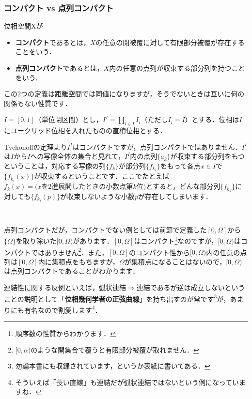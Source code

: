 \subsubsection{コンパクト vs 点列コンパクト}
\begin{defi}
位相空間Xが
\begin{itemize}
\item {\bf コンパクト}であるとは，$X$の任意の開被覆に対して有限部分被覆が存在することをいう．
\item {\bf 点列コンパクト}であるとは，$X$内の任意の点列が収束する部分列を持つことをいう．
\end{itemize}
\end{defi}
この2つの定義は距離空間では同値になりますが，そうでないときは互いに何の関係もない性質です．
\begin{ex}[$I^I$]
$I=[0,1]$（単位閉区間）とし，$I^I=\displaystyle \prod_{i\in I}I_i$（ただし$I_i=I$）とする．位相は$I$にユークリッド位相を入れたものの直積位相とする．
\end{ex}
Tychonoffの定理より$I^I$はコンパクトですが，点列コンパクトではありません．$I^I$は$I$から$I$への写像全体の集合と見れて，$I^I$内の点列$\{a_k\}$が収束する部分列をもつということは，対応する写像の列$\{f_k\}$が部分列$\{f_{k_i}\}$をもって各点$x\in I$で$\{ f_{k_i}(x) \}$が収束するということです．ここでたとえば$f_k(x)=(x\text{を2進展開したときの小数点第}k\text{位)}$とすると，どんな部分列$\{f_{k_1}\}$に対しても$\{f_{k_i}(p)\}$が収束しないような小数$p$が存在してしまいます．\par 
　\par
点列コンパクトだが，コンパクトでない例としては前節で定義した$[0,\Omega]$から$\{\Omega\}$を取り除いた$[0,\Omega)$があります．$[0,\Omega]$はコンパクト\footnote{順序数の性質からわかります．}なのですが，$[0,\Omega)$はコンパクトではありません\footnote{$[0,\alpha)$のような開集合で覆うと有限部分被覆が取れません．}．また，$[0,\Omega]$のコンパクト性から$[0,\Omega)$内の任意の点列は$[0,\Omega]$内に集積点をもちますが，$\Omega$が集積点になることはないので，$[0,\Omega)$は点列コンパクトであることがわかります．

連結性に関する反例といえば，弧状連結$\Rightarrow$連結であるが逆は成立しないということの説明として「{\bf 位相幾何学者の正弦曲線}」を持ち出すのが常です\footnote{勿論本書にも収録されています，というか表紙に書いてある．}が，あまりにも有名なので割愛します\footnote{そういえば「長い直線」も連結だが弧状連結ではないという例になっていますね．}．
